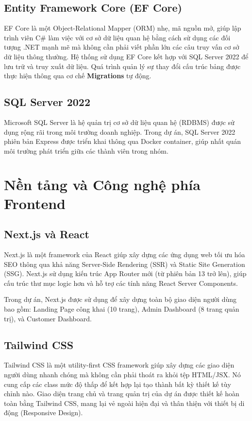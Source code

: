 \subsection{Entity Framework Core (EF Core)}
EF Core là một Object-Relational Mapper (ORM) nhẹ, mã nguồn mở, giúp lập trình viên C\# làm việc với cơ sở dữ liệu quan hệ bằng cách sử dụng các đối tượng .NET mạnh mẽ mà không cần phải viết phần lớn các câu truy vấn cơ sở dữ liệu thông thường. Hệ thống sử dụng EF Core kết hợp với SQL Server 2022 để lưu trữ và truy xuất dữ liệu. Quá trình quản lý sự thay đổi cấu trúc bảng được thực hiện thông qua cơ chế \textbf{Migrations} tự động.

\subsection{SQL Server 2022}
Microsoft SQL Server là hệ quản trị cơ sở dữ liệu quan hệ (RDBMS) được sử dụng rộng rãi trong môi trường doanh nghiệp. Trong dự án, SQL Server 2022 phiên bản Express được triển khai thông qua Docker container, giúp nhất quán môi trường phát triển giữa các thành viên trong nhóm.

\section{Nền tảng và Công nghệ phía Frontend}

\subsection{Next.js và React}
Next.js \cite{nextjs_docs} là một framework của React giúp xây dựng các ứng dụng web tối ưu hóa SEO thông qua khả năng Server-Side Rendering (SSR) và Static Site Generation (SSG). Next.js sử dụng kiến trúc App Router mới (từ phiên bản 13 trở lên), giúp cấu trúc thư mục logic hơn và hỗ trợ các tính năng React Server Components.

Trong dự án, Next.js được sử dụng để xây dựng toàn bộ giao diện người dùng bao gồm: Landing Page công khai (10 trang), Admin Dashboard (8 trang quản trị), và Customer Dashboard.

\subsection{Tailwind CSS}
Tailwind CSS là một utility-first CSS framework giúp xây dựng các giao diện người dùng nhanh chóng mà không cần phải thoát ra khỏi tệp HTML/JSX. Nó cung cấp các class mức độ thấp để kết hợp lại tạo thành bất kỳ thiết kế tùy chỉnh nào. Giao diện trang chủ và trang quản trị của dự án được thiết kế hoàn toàn bằng Tailwind CSS, mang lại vẻ ngoài hiện đại và thân thiện với thiết bị di động (Responsive Design).

